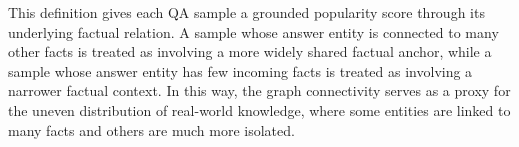 This definition gives each QA sample a grounded popularity score through its underlying factual relation. A sample whose answer entity is connected to many other facts is treated as involving a more widely shared factual anchor, while a sample whose answer entity has few incoming facts is treated as involving a narrower factual context. In this way, the graph connectivity serves as a proxy for the uneven distribution of real-world knowledge, where some entities are linked to many facts and others are much more isolated.

